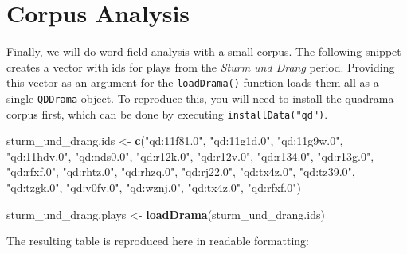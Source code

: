 \documentclass[]{book}
\newenvironment{Shaded}{\begin{snugshade}}{\end{snugshade}}
\newcommand{\KeywordTok}[1]{\textcolor[rgb]{0.13,0.29,0.53}{\textbf{#1}}}
\newcommand{\NormalTok}[1]{#1}
\newcommand{\OperatorTok}[1]{\textcolor[rgb]{0.81,0.36,0.00}{\textbf{#1}}}
\newcommand{\StringTok}[1]{\textcolor[rgb]{0.31,0.60,0.02}{#1}}
\begin{document}
\hypertarget{corpus-analysis-1}{%
\section{Corpus Analysis}\label{corpus-analysis-1}}

Finally, we will do word field analysis with a small corpus. The following snippet creates a vector with ids for plays from the \emph{Sturm und Drang} period. Providing this vector as an argument for the \texttt{loadDrama()} function loads them all as a single \texttt{QDDrama} object. To reproduce this, you will need to install the quadrama corpus first, which can be done by executing \texttt{installData("qd")}.

\begin{Shaded}
\begin{Highlighting}[]
\NormalTok{sturm_und_drang.ids <-}\StringTok{ }\KeywordTok{c}\NormalTok{(}\StringTok{"qd:11f81.0"}\NormalTok{, }\StringTok{"qd:11g1d.0"}\NormalTok{, }\StringTok{"qd:11g9w.0"}\NormalTok{, }
                         \StringTok{"qd:11hdv.0"}\NormalTok{, }\StringTok{"qd:nds0.0"}\NormalTok{, }\StringTok{"qd:r12k.0"}\NormalTok{, }
                         \StringTok{"qd:r12v.0"}\NormalTok{, }\StringTok{"qd:r134.0"}\NormalTok{,  }\StringTok{"qd:r13g.0"}\NormalTok{, }
                         \StringTok{"qd:rfxf.0"}\NormalTok{,  }\StringTok{"qd:rhtz.0"}\NormalTok{, }\StringTok{"qd:rhzq.0"}\NormalTok{, }
                         \StringTok{"qd:rj22.0"}\NormalTok{, }\StringTok{"qd:tx4z.0"}\NormalTok{, }\StringTok{"qd:tz39.0"}\NormalTok{, }
                         \StringTok{"qd:tzgk.0"}\NormalTok{, }\StringTok{"qd:v0fv.0"}\NormalTok{, }\StringTok{"qd:wznj.0"}\NormalTok{, }
                         \StringTok{"qd:tx4z.0"}\NormalTok{, }\StringTok{"qd:rfxf.0"}\NormalTok{)}

\NormalTok{sturm_und_drang.plays <-}\StringTok{ }\KeywordTok{loadDrama}\NormalTok{(sturm_und_drang.ids)}
\end{Highlighting}
\end{Shaded}

The resulting table is reproduced here in readable formatting:

\begin{Shaded}
\end{Shaded}
\end{document}
